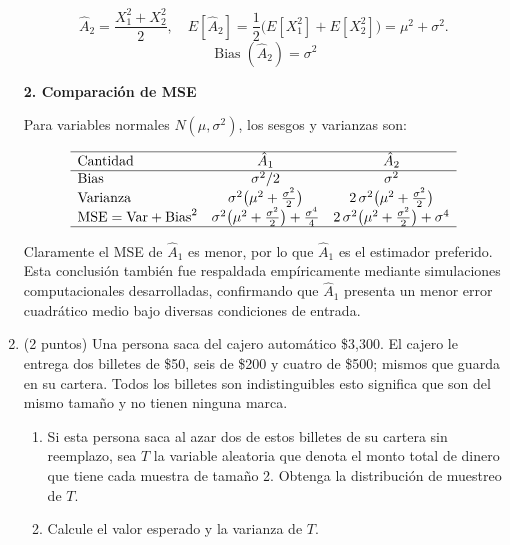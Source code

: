 \documentclass[12pt]{article}
\begin{document}
\begin{enumerate}
	      \[
		      \hat A_{2}= \frac{X_{1}^{2}+X_{2}^{2}}{2},\quad
		      E[\hat A_{2}]
		      =\frac{1}{2}\bigl(E[X_{1}^{2}]+E[X_{2}^{2}]\bigr)
		      =\mu^{2}+\sigma^{2}.
	      \]
	      \[
		      \boxed{\operatorname{Bias}(\hat A_{2})=\sigma^{2}}
	      \]

	      \medskip
	      \textbf{2. Comparación de MSE}

	      Para variables normales \(N(\mu,\sigma^{2})\), los sesgos y varianzas son:

	      \[
		      \begin{array}{lcc}
			      \hline
			      \text{Cantidad} & \hat A_{1}                                                                & \hat A_{2} \\
			      \hline
			      \text{Bias}     & \sigma^{2}/2                                                              & \sigma^{2} \\
			      \text{Varianza} & \sigma^{2}\bigl(\mu^{2}+\tfrac{\sigma^{2}}{2}\bigr)
			                      & 2\,\sigma^{2}\bigl(\mu^{2}+\tfrac{\sigma^{2}}{2}\bigr)                                 \\
			      \text{MSE} = \mathrm{Var} + \mathrm{Bias}^{2}
			                      & \sigma^{2}\bigl(\mu^{2}+\tfrac{\sigma^{2}}{2}\bigr)+\tfrac{\sigma^{4}}{4}
			                      & 2\,\sigma^{2}\bigl(\mu^{2}+\tfrac{\sigma^{2}}{2}\bigr)+\sigma^{4}                      \\
			      \hline
		      \end{array}
	      \]

	      Claramente el MSE de \(\hat A_{1}\) es menor, por lo que \(\hat A_{1}\) es el estimador preferido.\\
	      Esta conclusión también fue respaldada empíricamente mediante simulaciones computacionales desarrolladas, confirmando que \(\hat A_1\) presenta un menor error cuadrático medio bajo diversas condiciones de entrada.
	      \endgroup

	\item (2 puntos) Una persona saca del cajero automático \$3,300. El cajero le entrega dos billetes de \$50, seis de \$200 y cuatro de \$500; mismos que guarda en su cartera. Todos los billetes son indistinguibles esto significa que son del mismo tamaño y no tienen ninguna marca.

	      \begin{enumerate}
		      \item Si esta persona saca al azar dos de estos billetes de su cartera sin reemplazo,
		            sea $T$ la variable aleatoria que denota el monto total de dinero que tiene
		            cada muestra de tamaño 2. Obtenga la distribución de muestreo de $T$.
		      \item Calcule el valor esperado y la varianza de $T$.
	      \end{enumerate}


\end{enumerate}
\end{document}
